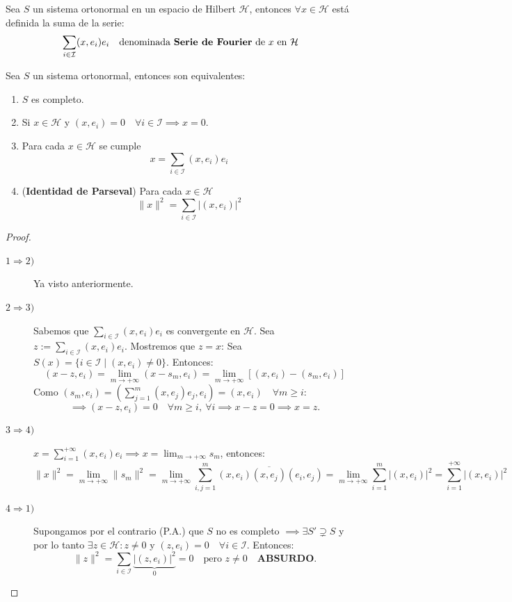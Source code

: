 \begin{definicion}
    Sea $S$ un sistema ortonormal en un espacio de Hilbert $\mathcal{H}$, entonces $\forall x \in \mathcal{H}$ está definida la suma de la serie:
    \[ \sum_{i \in \mathcal{I}} (x, e_i) e_i \quad \text{denominada \textbf{Serie de Fourier} de } x \text{ en } \mathcal{H} \]

\end{definicion}

\begin{prop}
    Sea $S$ un sistema ortonormal, entonces son equivalentes:
    \begin{enumerate}
        \item $S$ es completo.
        \item Si $x \in \mathcal{H}$ y $(x, e_i) = 0 \quad \forall i \in \mathcal{I} \implies x = 0$.
        \item Para cada $x \in \mathcal{H}$ se cumple
        $$x = \sum_{i \in \mathcal{I}} (x, e_i) e_i$$
        \item (\textbf{Identidad de Parseval}) Para cada $x \in \mathcal{H}$
        $$\|x\|^2 = \sum_{i \in \mathcal{I}} |(x, e_i)|^2$$
    \end{enumerate}
\begin{proof}
    \begin{description}
        \item[$1 \Longrightarrow 2)$] Ya visto anteriormente.
        \item[$2 \Longrightarrow 3)$] Sabemos que $\sum_{i \in \mathcal{I}} (x, e_i) e_i$ es convergente en $\mathcal{H}$. Sea $z := \sum_{i \in \mathcal{I}} (x, e_i) e_i$. Mostremos que $z = x$:
        Sea $S(x) = \{ i \in \mathcal{I} \mid (x, e_i) \neq 0 \}$. Entonces:
        \[ (x - z, e_i) = \lim_{m \to +\infty} (x - s_m, e_i) = \lim_{m \to +\infty} [ (x, e_i) - (s_m, e_i) ] \]
        Como $(s_m, e_i) = \left( \sum_{j=1}^m (x, e_j) e_j, e_i \right) = (x, e_i) \quad \forall m \ge i$:
        \[ \implies (x - z, e_i) = 0 \quad \forall m \ge i, \ \forall i \implies x - z = 0 \implies x = z. \]
        \item[$3 \Longrightarrow 4)$] $x = \sum_{i=1}^{+\infty} (x, e_i) e_i \implies x = \lim_{m \to +\infty} s_m$, entonces:
        \[ \|x\|^2 = \lim_{m \to +\infty} \|s_m\|^2 = \lim_{m \to +\infty} \sum_{i,j=1}^m (x, e_i)\overline{(x, e_j)} (e_i, e_j) = \lim_{m \to +\infty} \sum_{i=1}^m |(x, e_i)|^2 = \sum_{i=1}^{+\infty} |(x, e_i)|^2 \]
        \item[$4 \Longrightarrow 1)$] Supongamos por el contrario (P.A.) que $S$ no es completo $\implies \exists S' \supsetneq S$ y por lo tanto $\exists z \in \mathcal{H} : z \neq 0$ y $(z, e_i) = 0 \quad \forall i \in \mathcal{I}$. Entonces:
        \[ \|z\|^2 = \sum_{i \in \mathcal{I}} \underbrace{|(z, e_i)|^2}_{0} = 0 \quad \text{pero } z \neq 0 \quad \textbf{ABSURDO}. \]
    \end{description}
\end{proof}
\end{prop}

